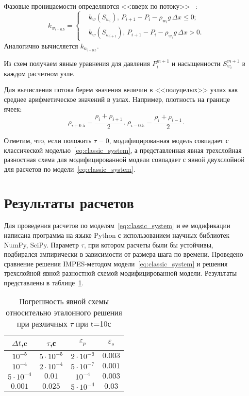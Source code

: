Фазовые проницаемости определяются <<вверх по потоку>> ~\cite{Kanevskaya}:
\begin{equation}
k_{w_{i+0.5}} =
 \begin{cases}
  &k_w(S_{w_i}),\, P_{i+1}-P_i-\rho_{w_i}g\,\Delta x \le 0;
  \\
  &k_w(S_{w_{i+1}}),\, P_{i+1}-P_i-\rho_{w_i}g\,\Delta x > 0.
 \end{cases}
\end{equation}
Аналогично вычисляется $k_{n_{i+0.5}}$.

Из схем получаем явные уравнения для давления $P_i^{m+1}$ и насыщенности $S_{w_i}^{m+1}$
в каждом расчетном узле. 

Для вычисления потока берем значения величин в <<полуцелых>> узлах как среднее арифметическое
значений в узлах. Например, плотность на границе ячеек:
\begin{equation}
\rho_{i+0.5}=\dfrac{\rho_i+\rho_{i+1}}{2},\, \rho_{i-0.5}=\dfrac{\rho_i+\rho_{i-1}}{2}.
\end{equation}

Отметим, что, если положить $\tau=0$, модифицированная модель совпадает с классической моделью~\eqref{eq:classic_system},
а представленная явная трехслойная разностная схема для модифицированной модели совпадает с явной двухслойной
для расчетов по модели~\eqref{eq:classic_system}.

\section{Результаты расчетов}
\label{calc_results}
Для проведения расчетов по моделям~\eqref{eq:classic_system} и ее модификации написана программа на языке Python с использованием научных библиотек NumPy, SciPy.
Параметр $\tau$, при котором расчеты были бы устойчивы, подбирался эмпирически в зависимости от размера шага по времени.
Проведено сравнение решения IMPES-методом модели~\eqref{eq:classic_system} и решения трехслойной явной разностной схемой
модифицированной модели.
Результаты представлены в таблице~\ref{tabular:results}.

\begin{table}[H]
\caption{Погрешность явной схемы относительно эталонного решения при различных $\tau$ при t=10с}
\label{tabular:results}
\begin{center}
\begin{tabular}{|c|c|c|c|}
\hline
$\Delta t$,c & $\tau$,с & $\varepsilon_p$ & $\varepsilon_s$  \\
\hline
$ 10^{-5}$ & $5 \cdot 10^{-5}$ & $ 2 \cdot 10^{-6}$ & $ 0.003 $ \\
\hline
$ 10^{-4}$ & $2 \cdot 10^{-4}$ & $ 5 \cdot 10^{-7}$ & $ 0.001 $ \\
\hline
$5 \cdot 10^{-4}$ & $0.01$ & $ 10^{-4}$ & $ 0.003 $ \\
\hline
$0.001$ & $0.025$ & $ 5 \cdot 10^{-4}$ & $ 0.03 $ \\
\hline
\end{tabular}
\end{center}
\end{table}


